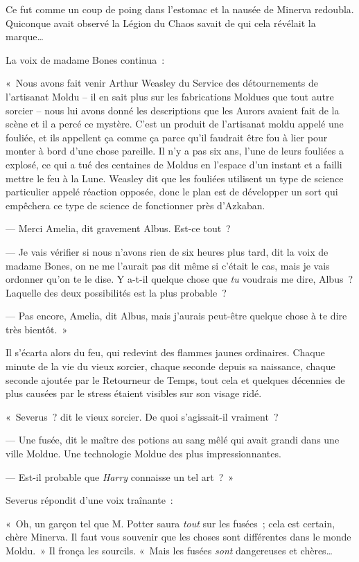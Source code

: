 Ce fut comme un coup de poing dans l'estomac et la nausée de Minerva redoubla. Quiconque avait observé la Légion du Chaos savait de qui cela révélait la marque…

La voix de madame Bones continua~:

«~Nous avons fait venir Arthur Weasley du Service des détournements de l'artisanat Moldu -- il en sait plus sur les fabrications Moldues que tout autre sorcier -- nous lui avons donné les descriptions que les Aurors avaient fait de la scène et il a percé ce mystère. C'est un produit de l'artisanat moldu appelé une fouliée, et ils appellent ça comme ça parce qu'il faudrait être fou à lier pour monter à bord d'une chose pareille. Il n'y a pas six ans, l'une de leurs fouliées a explosé, ce qui a tué des centaines de Moldus en l'espace d'un instant et a failli mettre le feu à la Lune. Weasley dit que les fouliées utilisent un type de science particulier appelé réaction opposée, donc le plan est de développer un sort qui empêchera ce type de science de fonctionner près d'Azkaban.

--- Merci Amelia, dit gravement Albus. Est-ce tout~?

--- Je vais vérifier si nous n'avons rien de six heures plus tard, dit la voix de madame Bones, on ne me l'aurait pas dit même si c'était le cas, mais je vais ordonner qu'on te le dise. Y a-t-il quelque chose que \emph{tu} voudrais me dire, Albus~? Laquelle des deux possibilités est la plus probable~?

--- Pas encore, Amelia, dit Albus, mais j'aurais peut-être quelque chose à te dire très bientôt.~»

Il s'écarta alors du feu, qui redevint des flammes jaunes ordinaires. Chaque minute de la vie du vieux sorcier, chaque seconde depuis sa naissance, chaque seconde ajoutée par le Retourneur de Temps, tout cela et quelques décennies de plus causées par le stress étaient visibles sur son visage ridé.

«~Severus~? dit le vieux sorcier. De quoi s'agissait-il vraiment~?

--- Une fusée, dit le maître des potions au sang mêlé qui avait grandi dans une ville Moldue. Une technologie Moldue des plus impressionnantes.

--- Est-il probable que \emph{Harry} connaisse un tel art~?~»

Severus répondit d'une voix traînante~:

«~Oh, un garçon tel que M. Potter saura \emph{tout} sur les fusées~; cela est certain, chère Minerva. Il faut vous souvenir que les choses sont différentes dans le monde Moldu.~» Il fronça les sourcils. «~Mais les fusées \emph{sont} dangereuses et chères…

